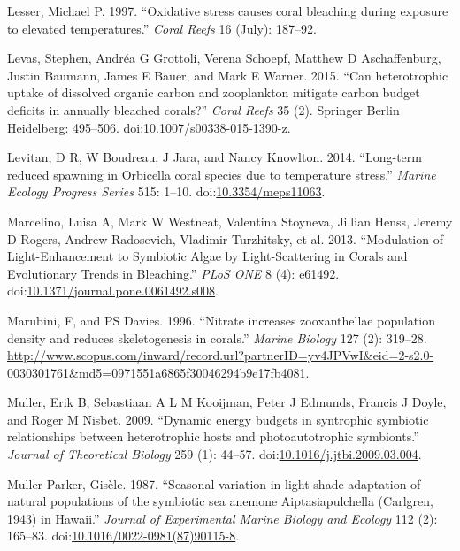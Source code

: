 \documentclass[]{elsarticle} %
\begin{document}
\hypertarget{ref-Lesser:1997p3587}{}
Lesser, Michael P. 1997. ``Oxidative stress causes coral bleaching
during exposure to elevated temperatures.'' \emph{Coral Reefs} 16
(July): 187--92.

\hypertarget{ref-Levas:2015ic}{}
Levas, Stephen, Andréa G Grottoli, Verena Schoepf, Matthew D
Aschaffenburg, Justin Baumann, James E Bauer, and Mark E Warner. 2015.
``Can heterotrophic uptake of dissolved organic carbon and zooplankton
mitigate carbon budget deficits in annually bleached corals?''
\emph{Coral Reefs} 35 (2). Springer Berlin Heidelberg: 495--506.
doi:\href{https://doi.org/10.1007/s00338-015-1390-z}{10.1007/s00338-015-1390-z}.

\hypertarget{ref-Levitan:2014et}{}
Levitan, D R, W Boudreau, J Jara, and Nancy Knowlton. 2014. ``Long-term
reduced spawning in Orbicella coral species due to temperature stress.''
\emph{Marine Ecology Progress Series} 515: 1--10.
doi:\href{https://doi.org/10.3354/meps11063}{10.3354/meps11063}.

\hypertarget{ref-Marcelino:2013hz}{}
Marcelino, Luisa A, Mark W Westneat, Valentina Stoyneva, Jillian Henss,
Jeremy D Rogers, Andrew Radosevich, Vladimir Turzhitsky, et al. 2013.
``Modulation of Light-Enhancement to Symbiotic Algae by Light-Scattering
in Corals and Evolutionary Trends in Bleaching.'' \emph{PLoS ONE} 8 (4):
e61492.
doi:\href{https://doi.org/10.1371/journal.pone.0061492.s008}{10.1371/journal.pone.0061492.s008}.

\hypertarget{ref-Marubini:1996p8460}{}
Marubini, F, and PS Davies. 1996. ``Nitrate increases zooxanthellae
population density and reduces skeletogenesis in corals.'' \emph{Marine
Biology} 127 (2): 319--28.
\url{http://www.scopus.com/inward/record.url?partnerID=yv4JPVwI\&eid=2-s2.0-0030301761\&md5=0971551a6865f30046294b9e17fb4081}.

\hypertarget{ref-Muller:2009io}{}
Muller, Erik B, Sebastiaan A L M Kooijman, Peter J Edmunds, Francis J
Doyle, and Roger M Nisbet. 2009. ``Dynamic energy budgets in syntrophic
symbiotic relationships between heterotrophic hosts and photoautotrophic
symbionts.'' \emph{Journal of Theoretical Biology} 259 (1): 44--57.
doi:\href{https://doi.org/10.1016/j.jtbi.2009.03.004}{10.1016/j.jtbi.2009.03.004}.

\hypertarget{ref-MullerParker:1987cr}{}
Muller-Parker, Gisèle. 1987. ``Seasonal variation in light-shade
adaptation of natural populations of the symbiotic sea anemone
Aiptasiapulchella (Carlgren, 1943) in Hawaii.'' \emph{Journal of
Experimental Marine Biology and Ecology} 112 (2): 165--83.
doi:\href{https://doi.org/10.1016/0022-0981(87)90115-8}{10.1016/0022-0981(87)90115-8}.
\end{document}
